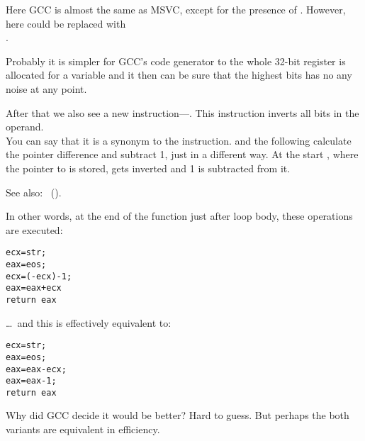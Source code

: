 Here GCC is almost the same as MSVC, except for the presence of \MOVZX.
However, here \MOVZX could be replaced with\\
.

Probably it is simpler for GCC's code generator to  
the whole 32-bit \EDX register 
is allocated for a \Tchar variable and it then can be sure that the highest bits has no any noise 
at any point.

\label{strlen_NOT_ADD}

After that we also see a new instruction---\NOT. This instruction inverts all bits in the operand. \\
You can say that it is a synonym to the  instruction. 
\NOT and the following \ADD calculate the pointer difference and subtract 1, just in a different way. 
At the start \ECX, where the pointer to  is stored, gets inverted and 1 is subtracted from it.

See also: \q{\SignedNumbersSectionName}~().
 
In other words, at the end of the function just after loop body, these operations are executed:

\begin{lstlisting}
ecx=str;
eax=eos;
ecx=(-ecx)-1; 
eax=eax+ecx
return eax
\end{lstlisting}

\dots~and this is effectively equivalent to:

\begin{lstlisting}
ecx=str;
eax=eos;
eax=eax-ecx;
eax=eax-1;
return eax
\end{lstlisting}

Why did GCC decide it would be better? Hard to guess. 
But perhaps the both variants are equivalent in efficiency.
